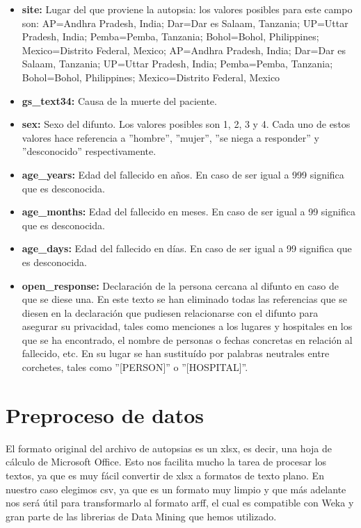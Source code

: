 \documentclass[10pt,a4paper,draft]{article}
\begin{document}
\begin{itemize}
\item \textbf{site:} Lugar del que proviene la autopsia: los valores posibles para este campo son: AP=Andhra Pradesh, India; Dar=Dar es Salaam, Tanzania; UP=Uttar Pradesh, India; Pemba=Pemba, Tanzania; Bohol=Bohol, Philippines; Mexico=Distrito Federal, Mexico; AP=Andhra Pradesh, India; Dar=Dar es Salaam, Tanzania; UP=Uttar Pradesh, India; Pemba=Pemba, Tanzania; Bohol=Bohol, Philippines; Mexico=Distrito Federal, Mexico
\item \textbf{gs\_text34:} Causa de la muerte del paciente.
\item \textbf{sex:} Sexo del difunto. Los valores posibles son 1, 2, 3 y 4. Cada uno de estos valores hace referencia a ''hombre'', ''mujer'', ''se niega a responder'' y ''desconocido'' respectivamente.
\item \textbf{age\_years:} Edad del fallecido en años. En caso de ser igual a 999 significa que es desconocida.
\item \textbf{age\_months:} Edad del fallecido en meses. En caso de ser igual a 99 significa que es desconocida.
\item \textbf{age\_days:} Edad del fallecido en días. En caso de ser igual a 99 significa que es desconocida.
\item \textbf{open\_response:} Declaración de la persona cercana al difunto en caso de que se diese una. En este texto se han eliminado todas las referencias que se diesen en la declaración que pudiesen relacionarse con el difunto para asegurar su privacidad, tales como menciones a los lugares y hospitales en los que se ha encontrado, el nombre de personas o fechas concretas en relación al fallecido, etc. En su lugar se han sustituído por palabras neutrales entre corchetes, tales como ''[PERSON]'' o ''[HOSPITAL]''.
\end{itemize}

\section{Preproceso de datos}
El formato original del archivo de autopsias es un xlsx, es decir, una hoja de cálculo de Microsoft Office. Esto nos facilita mucho la tarea de procesar los textos, ya que es muy fácil convertir de xlsx a formatos de texto plano. En nuestro caso elegimos csv, ya que es un formato muy limpio y que más adelante nos será útil para transformarlo al formato arff, el cual es compatible con Weka y gran parte de las librerias de Data Mining que hemos utilizado.\\
\end{document}

